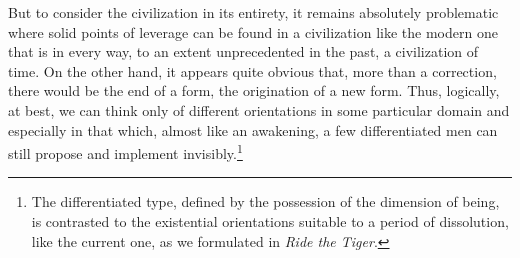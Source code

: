 But to consider the civilization in its entirety, it remains absolutely problematic where solid points of leverage can be found in a civilization like the modern one that is in every way, to an extent unprecedented in the past, a civilization of time. On the other hand, it appears quite obvious that, more than a correction, there would be the end of a form, the origination of a new form. Thus, logically, at best, we can think only of different orientations in some particular domain and especially in that which, almost like an awakening, a few differentiated men can still propose and implement invisibly.\footnote{The differentiated type, defined by the possession of the dimension of being, is contrasted to the existential orientations suitable to a period of dissolution, like the current one, as we formulated in \emph{Ride the Tiger}.}


